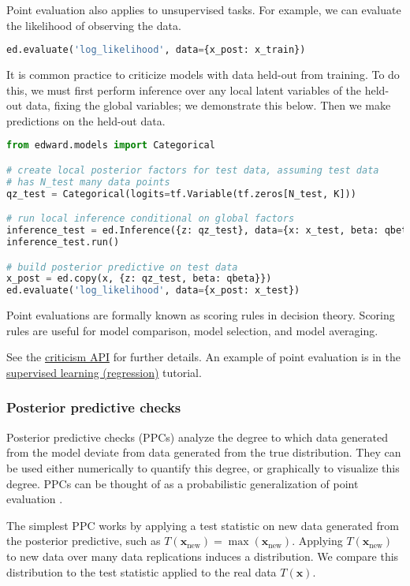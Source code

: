 Point evaluation also applies to unsupervised tasks. For example, we
can evaluate the likelihood of observing the data.
\begin{lstlisting}[language=Python]
ed.evaluate('log_likelihood', data={x_post: x_train})
\end{lstlisting}

It is common practice to criticize models with data held-out from
training. To do this, we must first perform inference over any local
latent variables of the held-out data, fixing the global variables; we
demonstrate this below. Then we make predictions on the held-out data.

\begin{lstlisting}[language=Python]
from edward.models import Categorical

# create local posterior factors for test data, assuming test data
# has N_test many data points
qz_test = Categorical(logits=tf.Variable(tf.zeros[N_test, K]))

# run local inference conditional on global factors
inference_test = ed.Inference({z: qz_test}, data={x: x_test, beta: qbeta})
inference_test.run()

# build posterior predictive on test data
x_post = ed.copy(x, {z: qz_test, beta: qbeta}})
ed.evaluate('log_likelihood', data={x_post: x_test})
\end{lstlisting}

Point evaluations are formally known as scoring rules
in decision theory. Scoring rules are useful for model comparison, model
selection, and model averaging.

See the \href{/api/criticism}{criticism API} for further details.
An example of point evaluation is in the
\href{/tutorials/supervised-regression}{supervised learning
(regression)} tutorial.

\subsubsection{Posterior predictive checks}

Posterior predictive checks (PPCs)
analyze the degree to which data generated from the model deviate from
data generated from the true distribution. They can be used either
numerically to quantify this degree, or graphically to visualize this
degree. PPCs can be thought of as a probabilistic generalization of
point evaluation
\citep{box1980sampling,rubin1984bayesianly,meng1994posterior,gelman1996posterior}.

The simplest PPC works by applying a test statistic on new data
generated from the posterior predictive, such as
$T(\mathbf{x}_\text{new}) = \max(\mathbf{x}_\text{new})$.  Applying
$T(\mathbf{x}_\text{new})$ to new data over many data replications
induces a distribution. We compare this distribution to the test
statistic applied to the real data $T(\mathbf{x})$.

